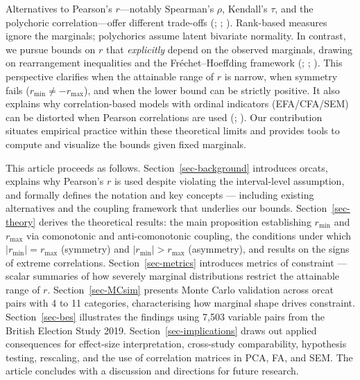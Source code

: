 \documentclass[
  12pt,
]{article}
\theoremstyle{plain}
\theoremstyle{definition}
\theoremstyle{remark}
\begin{document}
Alternatives to Pearson's \(r\)---notably Spearman's \(\rho\), Kendall's
\(\tau\), and the polychoric correlation---offer different trade-offs
(;
;
). Rank-based measures ignore
the marginals; polychorics assume latent bivariate normality. In
contrast, we pursue bounds on \(r\) that \emph{explicitly} depend on the
observed marginals, drawing on rearrangement inequalities and the
Fréchet--Hoeffding framework (; ;
). This perspective
clarifies when the attainable range of \(r\) is narrow, when symmetry
fails (\(r_{\min}\neq -r_{\max}\)), and when the lower bound can be
strictly positive. It also explains why correlation-based models with
ordinal indicators (EFA/CFA/SEM) can be distorted when Pearson
correlations are used (; ). Our
contribution situates empirical practice within these theoretical limits
and provides tools to compute and visualize the bounds given fixed
marginals.

This article proceeds as follows. Section~\ref{sec-background}
introduces orcats, explains why Pearson's \(r\) is used despite
violating the interval-level assumption, and formally defines the
notation and key concepts --- including existing alternatives and the
coupling framework that underlies our bounds. Section~\ref{sec-theory}
derives the theoretical results: the main proposition establishing
\(r_{\min}\) and \(r_{\max}\) via comonotonic and anti-comonotonic
coupling, the conditions under which \(|r_{\min}| = r_{\max}\)
(symmetry) and \(|r_{\min}| > r_{\max}\) (asymmetry), and results on the
signs of extreme correlations. Section~\ref{sec-metrics} introduces
metrics of constraint --- scalar summaries of how severely marginal
distributions restrict the attainable range of \(r\).
Section~\ref{sec-MCsim} presents Monte Carlo validation across orcat
pairs with 4 to 11 categories, characterising how marginal shape drives
constraint. Section~\ref{sec-bes} illustrates the findings using 7,503
variable pairs from the British Election Study 2019.
Section~\ref{sec-implications} draws out applied consequences for
effect-size interpretation, cross-study comparability, hypothesis
testing, rescaling, and the use of correlation matrices in PCA, FA, and
SEM. The article concludes with a discussion and directions for future
research.
\end{document}

